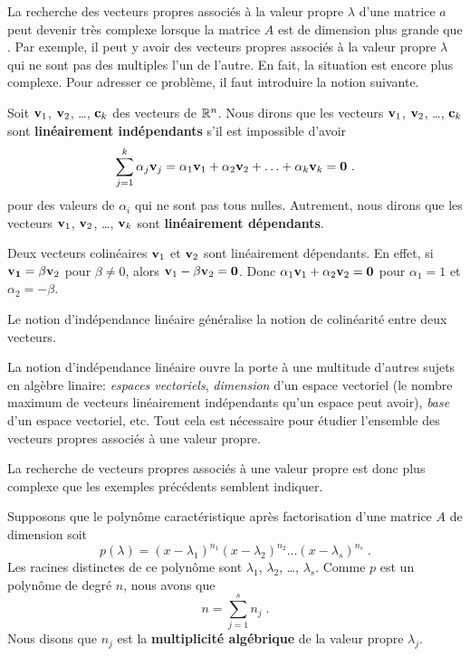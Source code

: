 {La recherche des vecteurs propres associés à la valeur propre
$\lambda$ d'une matrice $a$ peut devenir très complexe lorsque la
matrice $A$ est de dimension plus grande que .  Par exemple,
il peut y avoir des vecteurs propres associés à la valeur propre
$\lambda$ qui ne sont pas des multiples l'un de l'autre.  En fait, la
situation est encore plus complexe.  Pour adresser ce problème, il
faut introduire la notion suivante.

\begin{focus}{\dfn}
Soit $\mathbf{v}_1$, $\mathbf{v}_2$, \ldots, $\mathbf{c}_k$ des vecteurs de
$\mathbb{R}^n$.  Nous dirons que les vecteurs
$\mathbf{v}_1$, $\mathbf{v}_2$, \ldots, $\mathbf{c}_k$ sont
{\bfseries linéairement indépendants} s'il est impossible d'avoir
\[
  \sum_{j=1}^k \alpha_j \mathbf{v}_j
  = \alpha_1 \mathbf{v}_1 + \alpha_2 \mathbf{v}_2 + \ldots + \alpha_k
  \mathbf{v}_k = \mathbf{0} \ .
\]
pour des valeurs de $\alpha_i$ qui ne sont pas tous nulles.  
Autrement, nous dirons que les vecteurs $\mathbf{v}_1$, $\mathbf{v}_2$,
\ldots, $\mathbf{v}_k$ sont {\bfseries linéairement dépendants}.
\end{focus}

\begin{egg}
Deux vecteurs colinéaires $\mathbf{v}_1$ et $\mathbf{v}_2$ sont
linéairement dépendants.  En effet, si $\mathbf{v_1} = \beta \mathbf{v}_2$
pour $\beta \neq 0$, alors $\mathbf{v}_1 - \beta \mathbf{v}_2 = \mathbf{0}$.
Donc $\alpha_1 \mathbf{v}_1 + \alpha_2 \mathbf{v}_2 = \mathbf{0}$ pour
$\alpha_1 =1$ et $\alpha_2 = -\beta$.
\end{egg}

Le notion d'indépendance linéaire généralise la notion de colinéarité
entre deux vecteurs.

\begin{rmk}[\theory]
La notion d'indépendance linéaire ouvre la porte à une multitude
d'autres sujets en algèbre linaire: {\em espaces vectoriels},
{\em dimension} d'un espace vectoriel (le nombre maximum de vecteurs
linéairement indépendants qu'un espace peut avoir), {\em base} d'un espace
vectoriel, etc.  Tout cela est nécessaire pour étudier l'ensemble des
vecteurs propres associés à une valeur propre.

La recherche de vecteurs propres associés à une valeur propre est donc
plus complexe que les exemples précédents semblent indiquer.

Supposons que le polynôme caractéristique après factorisation d'une
matrice $A$ de dimension \nn soit
\[
p(\lambda) = (x-\lambda_1)^{n_1}(x-\lambda_2)^{n_2}\ldots(x-\lambda_s)^{n_s}
\; .
\]
Les racines distinctes de ce polynôme sont $\lambda_1$, $\lambda_2$,
\ldots, $\lambda_s$.  Comme $p$ est un polynôme de degré $n$, nous avons que
\[
n = \sum_{j=1}^s n_j \; .
\]
Nous disons que $n_j$ est la
{\bfseries multiplicité algébrique} de la valeur propre $\lambda_j$.


\end{rmk}}
